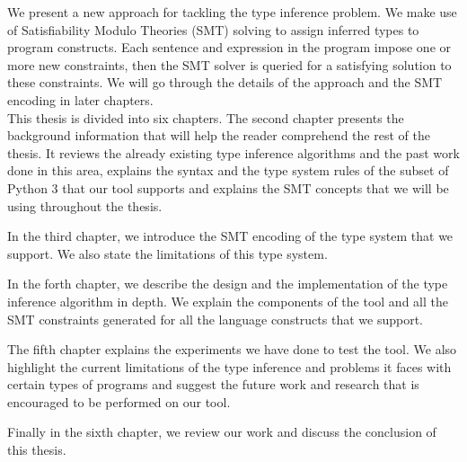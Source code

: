 We present a new approach for tackling the type inference problem. We make use of Satisfiability Modulo Theories (SMT) solving to assign inferred types to program constructs. Each sentence and expression in the program impose one or more new constraints, then the SMT solver is queried for a satisfying solution to these constraints. We will go through the details of the approach and the SMT encoding in later chapters.\\
 
This thesis is divided into six chapters. The second chapter presents the background information that will help the reader comprehend the rest of the thesis. It reviews the already existing type inference algorithms and the past work done in this area, explains the syntax and the type system rules of the subset of Python 3 that our tool supports and explains the SMT concepts that we will be using throughout the thesis.

In the third chapter, we introduce the SMT encoding of the type system that we support. We also state the limitations of this type system.

In the forth chapter, we describe the design and the implementation of the type inference algorithm in depth. We explain the components of the tool and all the SMT constraints generated for all the language constructs that we support.

The fifth chapter explains the experiments we have done to test the tool. We also highlight the current limitations of the type inference and problems it faces with certain types of programs and suggest the future work and research that is encouraged to be performed on our tool.

Finally in the sixth chapter, we review our work and discuss the conclusion of this thesis.